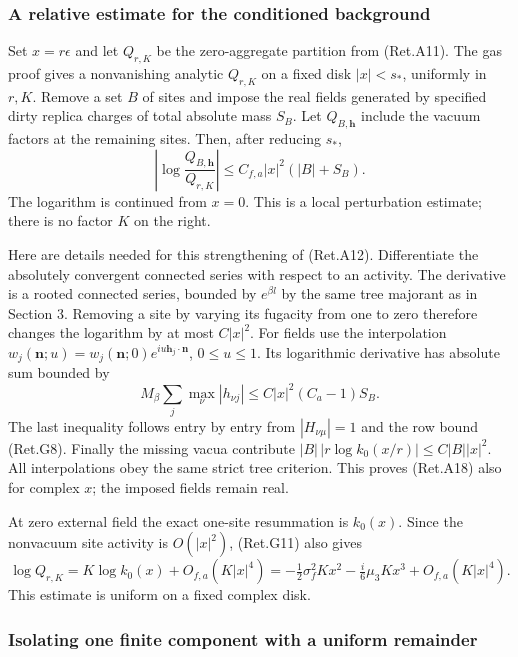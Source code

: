 \hypertarget{a-relative-estimate-for-the-conditioned-background}{%
\subsubsection{A relative estimate for the conditioned background}\label{a-relative-estimate-for-the-conditioned-background}}

Set \(x=r\epsilon\) and let \(Q_{r,K}\) be the zero-aggregate partition
from (Ret.A11). The gas proof gives a nonvanishing analytic \(Q_{r,K}\)
on a fixed disk \(|x|<s_*\), uniformly in \(r,K\).
Remove a set \(B\) of sites and impose the real fields generated by
specified dirty replica charges of total absolute mass \(S_B\).
Let \(Q_{B,\boldsymbol h}\) include the vacuum factors at the remaining
sites. Then, after reducing \(s_*\),
\[
 \left|\log\frac{Q_{B,\boldsymbol h}}{Q_{r,K}}\right|
          \le C_{f,a}|x|^2(|B|+S_B).                       \tag{Ret.A18}
\]
The logarithm is continued from \(x=0\).
This is a local perturbation estimate; there is no factor \(K\) on
the right.

Here are details needed for this strengthening of (Ret.A12).
Differentiate the absolutely convergent connected series with respect
to an activity. The derivative is a rooted connected series, bounded
by \(e^{\beta l}\) by the same tree majorant as in Section 3.
Removing a site by varying its fugacity from one to zero therefore
changes the logarithm by at most \(C|x|^2\).
For fields use the interpolation
\(w_j(\boldsymbol n;u)=w_j(\boldsymbol n;0)  e^{iu\boldsymbol h_j\cdot\boldsymbol n}\), \(0\le u\le1\).
Its logarithmic derivative has absolute sum bounded by
\[
 M_\beta\sum_j\max_\nu|h_{\nu j}|
       \le C|x|^2(C_a-1)S_B.
\]
The last inequality follows entry by entry from \(|H_{\nu\mu}|=1\)
and the row bound (Ret.G8). Finally the missing vacua contribute
\(|B|\,|r\log k_0(x/r)|\le C|B||x|^2\).
All interpolations obey the same strict tree criterion.
This proves (Ret.A18) also for complex \(x\); the imposed fields remain real.

At zero external field the exact one-site resummation is \(k_0(x)\).
Since the nonvacuum site activity is \(O(|x|^2)\), (Ret.G11) also gives
\[
 \log Q_{r,K}
   =K\log k_0(x)+O_{f,a}(K|x|^4)
   =-\tfrac12\sigma_f^2Kx^2
       -\tfrac{i}{6}\mu_3Kx^3+O_{f,a}(K|x|^4).             \tag{Ret.A19}
\]
This estimate is uniform on a fixed complex disk.

\hypertarget{isolating-one-finite-component-with-a-uniform-remainder}{%
\subsubsection{Isolating one finite component with a uniform remainder}\label{isolating-one-finite-component-with-a-uniform-remainder}}

